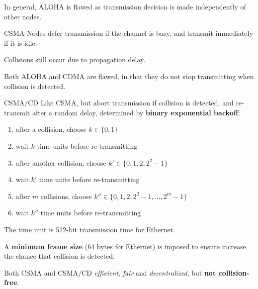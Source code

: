 In general, ALOHA is flawed as transmission decision is made independently of other nodes.

\begin{defn}{CSMA}
    Nodes defer transmission if the channel is busy, and transmit immediately if it is idle.
\end{defn}

Collisions still occur due to propagation delay.

Both ALOHA and CDMA are flawed, in that they do not stop transmitting when collision is detected.

\begin{defn}{CSMA/CD}
    Like CSMA, but abort transmission if collision is detected, and re-transmit after a random delay,
    determined by \textbf{binary exponential backoff}:

    \begin{enumerate}
        \item after a collision, choose $k \in \{0, 1\}$
        \item wait $k$ time units before re-transmitting
        \item after another collision, choose $k' \in \{0, 1, 2, 2^2 - 1\}$
        \item wait $k'$ time units before re-transmitting
        \item after $m$ collisions, choose $k'' \in \{0, 1, 2, 2^2 - 1, \dots, 2^m - 1\}$
        \item wait $k''$ time units before re-transmitting
    \end{enumerate}

    The time unit is 512-bit transmission time for Ethernet.

    A \textbf{minimum frame size} (64 bytes for Ethernet) is imposed to ensure increase
    the chance that collision is detected.
\end{defn}

Both CSMA and CSMA/CD \textit{efficient}, \textit{fair} and \textit{decentralized},
but \textbf{not collision-free}.